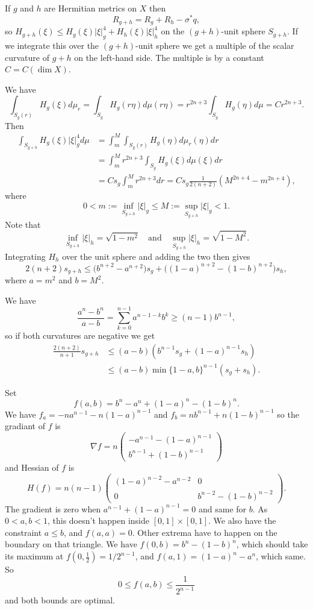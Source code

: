 \documentclass[11pt]{article}
\theoremstyle{definition}
\def\qandq{\quad\text{and}\quad}
\begin{document}
If $g$ and $h$ are Hermitian metrics on $X$ then
\[
R_{g + h} = R_g + R_h - \sigma^*q,
\]
so
$
H_{g+h}(\xi) \leq H_g(\xi)|\xi|_g^4 + H_h(\xi) |\xi|_h^4
$
on the $(g+h)$-unit sphere $S_{g+h}$.
If we integrate this over the $(g+h)$-unit sphere we get a multiple of the
scalar curvature of $g+h$ on the left-hand side.
The multiple is by a constant $C = C(\dim X)$.

We have
$$
\int_{S_g(r)} H_g(\xi) d\mu_r
= \int_{S_g} H_g(r \eta) d\mu(r \eta)
= r^{2n+3} \int_{S_g} H_g(\eta) d\mu
= C r^{2n+3}.
$$
Then
\begin{align*}
\int_{S_{g+h}} H_{g}(\xi) |\xi|^4_g d\mu
&= \int_m^M \int_{S_g(r)} H_g(\eta) d\mu_r(\eta) dr
\\
&= \int_m^M r^{2n+3} \int_{S_g} H_g(\xi) d\mu(\xi) dr
\\
&= C s_g \int_m^M r^{2n+3} dr
= C s_g \frac{1}{2(n+2)}(M^{2n+4} - m^{2n+4}),
\end{align*}
where
$$
0 < m := \inf_{S_{g+h}} |\xi|_g \leq M := \sup_{S_{g+h}} |\xi|_g < 1.
$$
Note that
$$
\inf_{S_{g+h}} |\xi|_h = \sqrt{1-m^2}
\qandq
\sup_{S_{g+h}} |\xi|_h = \sqrt{1-M^2}.
$$
Integrating $H_h$ over the unit sphere and adding the two then gives
$$
2(n+2) s_{g+h}
\leq
\bigl(b^{n+2} - a^{n+2}\bigr) s_g
+ \bigl((1-a)^{n+2} - (1-b)^{n+2}\bigr) s_h,
$$
where $a = m^2$ and $b = M^2$.

We have
$$
\frac{a^n - b^n}{a - b}
= \sum_{k=0}^{n-1} a^{n-1-k} b^k
\geq (n-1) b^{n-1},
$$
so if both curvatures are negative we get
\begin{align*}
\frac{2(n+2)}{n+1} s_{g+h}
&\leq
(a-b)(b^{n-1} s_g + (1-a)^{n-1} s_h)
\\
&\leq
(a-b) \min\{1-a, b\}^{n-1}(s_g + s_h).
\end{align*}

Set
$$
f(a, b) = b^n - a^n + (1-a)^n - (1-b)^n.
$$
We have $f_a = -n a^{n-1} - n(1-a)^{n-1}$ and $f_b = n b^{n-1} + n(1-b)^{n-1}$
so the gradiant of $f$ is
$$
\nabla f = n \begin{pmatrix}
- a^{n-1} - (1-a)^{n-1}
\\
b^{n-1} + (1-b)^{n-1}
\end{pmatrix}
$$
and Hessian of $f$ is
$$
H(f) =
n(n-1)
\begin{pmatrix}
(1-a)^{n-2} - a^{n-2} & 0
\\
0 & b^{n-2} - (1-b)^{n-2}
\end{pmatrix}.
$$
The gradient is zero when $a^{n-1} + (1-a)^{n-1} = 0$ and same for $b$. As
$0 < a, b < 1$, this doesn't happen inside $[0,1] \times [0,1]$.
We also have the constraint $a \leq b$, and $f(a,a) = 0$.
Other extrema have to happen on the boundary on that triangle. We have
$f(0,b) = b^n - (1-b)^n$, which should take its maximum at $f(0,\frac12) =
1/2^{n-1}$, and $f(a,1) = (1-a)^n - a^n$, which same. So
$$
0 \leq f(a,b) \leq \frac 1{2^{n-1}}
$$
and both bounds are optimal.
\end{document}
